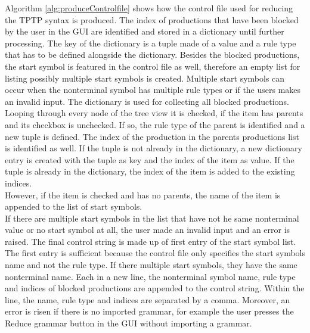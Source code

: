 Algorithm \ref{alg:produceControlfile} shows how the control file used for reducing the \ac{TPTP} syntax is produced. The index of productions that have been blocked by the user in the GUI are identified and stored in a dictionary until further processing. The key of the dictionary is a tuple made of a value and a rule type that has to be defined alongside the dictionary. Besides the blocked productions, the start symbol is featured in the control file as well, therefore an empty list for listing possibly multiple start symbols is created. Multiple start symbols can occur when the nonterminal symbol has multiple rule types or if the users makes an invalid input. The dictionary is used for collecting all blocked productions. Looping through every node of the tree view it is checked, if the item has parents and its checkbox is unchecked. If so, the rule type of the parent is identified and a new tuple is defined. The index of the production in the parents productions list is identified as well. If the tuple is not already in the dictionary, a new dictionary entry is created with the tuple as key and the index of the item as value. If the tuple is already in the dictionary, the index of the item is added to the existing indices. \\
However, if the item is checked and has no parents, the name of the item is appended to the list of start symbols. \\
If there are multiple start symbols in the list that have not he same nonterminal value or no start symbol at all, the user made an invalid input and an error is raised. 
The final control string is made up of first entry of the start symbol list. The first entry is sufficient because the control file only specifies the start symbols name and not the rule type. If there multiple start symbols, they have the same nonterminal name. 
Each in a new line, the nonterminal symbol name, rule type and indices of blocked productions are appended to the control string. Within the line, the name, rule type and indices are separated by a comma.
Moreover, an error is risen if there is no imported grammar, for example the user presses the Reduce grammar button in the GUI without importing a grammar.

